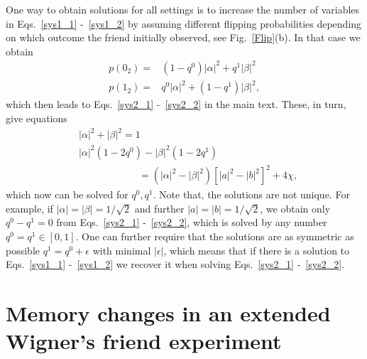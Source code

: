 \documentclass[a4paper,twocolumn,11pt,accepted=2017-05-09,dvipsnames]{quantumarticle}
\numberwithin{equation}{section}
\begin{document}
\begin{appendix}
One way to obtain solutions for all settings is to increase the number of variables in Eqs.~\eqref{sys1_1} -~\eqref{sys1_2} by assuming different flipping probabilities depending on which outcome the friend initially observed, see Fig.~\ref{Flip}(b). In that case we obtain
\begin{align}
p(0_2)=&(1-q^0)|\alpha|^2 + q^1|\beta|^2\\
p(1_2)=&q^0|\alpha|^2 + (1-q^1)|\beta|^2,
\end{align}
which then leads to Eqs.~\eqref{sys2_1} -~\eqref{sys2_2} in the main text. These, in turn, give equations
\begin{align*}
&|\alpha|^2+|\beta|^2=1\\
&|\alpha|^2(1-2q^0)-|\beta|^2(1-2q^1)\\
& \qquad \qquad \qquad= (|\alpha|^2-|\beta|^2)[|a|^2- |b|^2]^2+4\chi,
\end{align*}
which now can be solved for $q^0,q^1$. Note that, the solutions are not unique. For example, if $|\alpha|=|\beta|=1/\sqrt{2}$ and further $|a|=|b|=1/\sqrt{2}$, we obtain only $q^0-q^1=0$ from Eqs.~\eqref{sys2_1} -~\eqref{sys2_2}, which is solved by any number $q^0=q^1\in[0,1]$. One can further require that the solutions are as symmetric as possible $q^1=q^0+\epsilon$ with minimal $|\epsilon|$, which means that if there is a solution to Eqs.~\eqref{sys1_1} -~\eqref{sys1_2} we recover it when solving Eqs.~\eqref{sys2_1} -~\eqref{sys2_2}.


\section{Memory changes in an extended Wigner's friend experiment}
\label{app:Ext}


\end{appendix}
\end{document}
